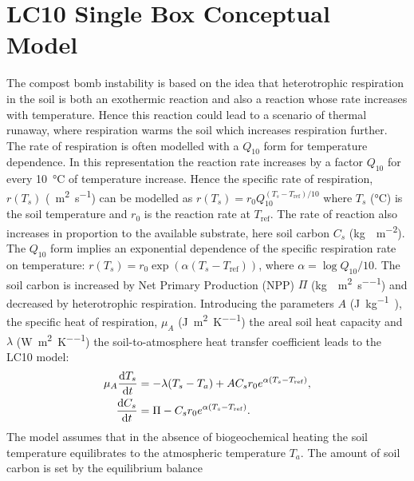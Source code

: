\section{LC10 Single Box Conceptual Model}
\label{sec:lc10}
The compost bomb instability is based on the idea that heterotrophic respiration in the soil is both an exothermic reaction \parencite{Thornley1971} and
also a reaction whose rate increases with temperature. Hence this reaction could lead to a scenario of thermal runaway, where respiration warms the soil which increases respiration further.
The rate of respiration is often modelled with a $Q_{10}$ form \parencite{Kirschbaum1995} for temperature dependence.
In this representation the reaction rate increases by a factor $Q_{10}$
for every \SI{10}{\degreeCelsius} of temperature increase.
Hence the specific rate of respiration, $r(T_s)$ (\si{\per\square\meter\per\second}) can be modelled as $r(T_s) = r_0 Q_{10}^{\left(T_s - T_{\mathrm{ref}}\right)/10}$
where $T_s$ (\si{\degreeCelsius}) is the soil temperature and $r_0$ is the reaction rate at
$T_{\mathrm{ref}}$. The rate of reaction also increases in proportion to the available substrate, here soil carbon $C_s$ (\si{\kilo\gram\carbon\per\square\meter}).
The $Q_{10}$ form implies an exponential dependence of the specific respiration rate on temperature:  $r(T_s)=r_0 \exp\left(\alpha\left(T_s-T_{\mathrm{ref}}\right)\right)$, where
$\alpha = \log Q_{10}/10$. The soil carbon is increased by Net Primary Production (NPP)
$\Pi$ (\si{\kilo\gram\carbon\per\square\meter\per\second}) and decreased by heterotrophic respiration. Introducing the parameters $A$ (\si{\joule\per\kilo\gram\carbon}), the specific heat
of respiration, $\mu_A$ (\si{\joule\per\square\meter\per\kelvin}) the areal soil heat capacity and $\lambda$ (\si{\watt\per\square\meter\per\kelvin})
the soil-to-atmosphere heat transfer coefficient leads to the LC10 model:
\begin{subequations}

  \label{eq:lc10}
 \begin{align}
   \mu_A\dv{T_s}{t} &= -\lambda (T_s - T_a) + AC_sr_0e^{\alpha (T_s - T_{\mathrm{ref}})}, \label{subeq:lc10_temperature}\\
  \dv{C_s}{t} &= \Pi - C_sr_0e^{\alpha (T_s - T_{\mathrm{ref}})}.  \label{subeq:lc10_soil_carbon}
 \end{align}
\end{subequations}
The model assumes that in the absence of biogeochemical heating the soil temperature equilibrates to the atmospheric temperature $T_a$. The amount of soil carbon is set by the equilibrium balance
